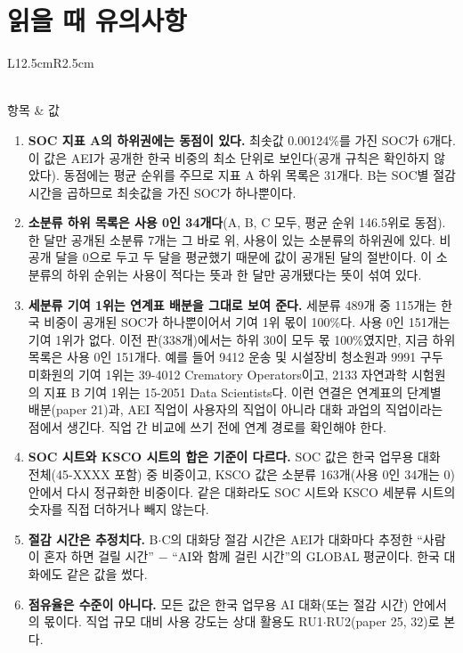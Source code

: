 \documentclass[11pt]{article}
\begin{document}
\section{읽을 때 유의사항}

\begin{longtable}{L{12.5cm}R{2.5cm}}
\caption{하위 목록과 기여 1위를 읽을 때 쓰는 점검 수치}\label{tab:notes}\\
\toprule
항목 & 값 \\
\midrule
\endfirsthead

\bottomrule
\end{longtable}

\begin{enumerate}[leftmargin=*]
  \item \textbf{SOC 지표 A의 하위권에는 동점이 있다.} 최솟값 0.00124\%를 가진 SOC가 6개다. 이 값은 AEI가 공개한 한국 비중의 최소 단위로 보인다(공개 규칙은 확인하지 않았다). 동점에는 평균 순위를 주므로 지표 A 하위 목록은 31개다. B는 SOC별 절감 시간을 곱하므로 최솟값을 가진 SOC가 하나뿐이다.
  \item \textbf{소분류 하위 목록은 사용 0인 34개다}(A, B, C 모두, 평균 순위 146.5위로 동점). 한 달만 공개된 소분류 7개는 그 바로 위, 사용이 있는 소분류의 하위권에 있다. 비공개 달을 0으로 두고 두 달을 평균했기 때문에 값이 공개된 달의 절반이다. 이 소분류의 하위 순위는 사용이 적다는 뜻과 한 달만 공개됐다는 뜻이 섞여 있다.
  \item \textbf{세분류 기여 1위는 연계표 배분을 그대로 보여 준다.} 세분류 489개 중 115개는 한국 비중이 공개된 SOC가 하나뿐이어서 기여 1위 몫이 100\%다. 사용 0인 151개는 기여 1위가 없다. 이전 판(338개)에서는 하위 30이 모두 몫 100\%였지만, 지금 하위 목록은 사용 0인 151개다. 예를 들어 9412 운송 및 시설장비 청소원과 9991 구두 미화원의 기여 1위는 39-4012 Crematory Operators이고, 2133 자연과학 시험원의 지표 B 기여 1위는 15-2051 Data Scientists다. 이런 연결은 연계표의 단계별 배분(paper 21)과, AEI 직업이 사용자의 직업이 아니라 대화 과업의 직업이라는 점에서 생긴다. 직업 간 비교에 쓰기 전에 연계 경로를 확인해야 한다.
  \item \textbf{SOC 시트와 KSCO 시트의 합은 기준이 다르다.} SOC 값은 한국 업무용 대화 전체(45-XXXX 포함) 중 비중이고, KSCO 값은 소분류 163개(사용 0인 34개는 0) 안에서 다시 정규화한 비중이다. 같은 대화라도 SOC 시트와 KSCO 세분류 시트의 숫자를 직접 더하거나 빼지 않는다.
  \item \textbf{절감 시간은 추정치다.} B$\cdot$C의 대화당 절감 시간은 AEI가 대화마다 추정한 ``사람이 혼자 하면 걸릴 시간'' $-$ ``AI와 함께 걸린 시간''의 GLOBAL 평균이다. 한국 대화에도 같은 값을 썼다.
  \item \textbf{점유율은 수준이 아니다.} 모든 값은 한국 업무용 AI 대화(또는 절감 시간) 안에서의 몫이다. 직업 규모 대비 사용 강도는 상대 활용도 RU1$\cdot$RU2(paper 25, 32)로 본다.
\end{enumerate}
\end{document}
